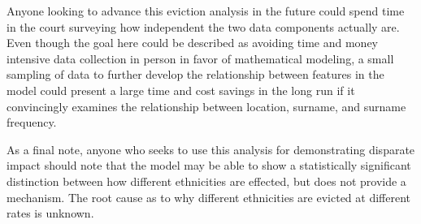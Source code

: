 \par Anyone looking to advance this eviction analysis in the future could spend time in the court surveying how independent the two data components actually are.  Even though the goal here could be described as avoiding time and money intensive data collection in person in favor of mathematical modeling, a small sampling of data to further develop the relationship between features in the model could present a large time and cost savings in the long run if it convincingly examines the relationship between location, surname, and surname frequency.

\par As a final note, anyone who seeks to use this analysis for demonstrating disparate impact should note that the model may be able to show a statistically significant distinction between how different ethnicities are effected, but does not provide a mechanism.  The root cause as to why different ethnicities are evicted at different rates is unknown.